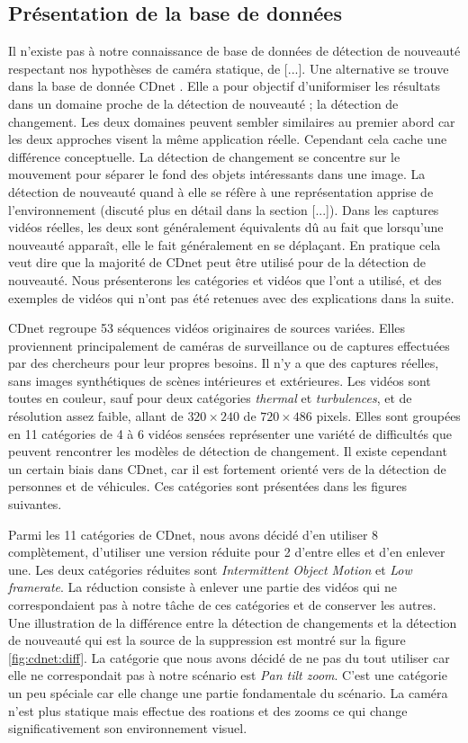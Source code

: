 	\subsection{Présentation de la base de données}

	Il n'existe pas à notre connaissance de base de données de détection de nouveauté respectant nos hypothèses de caméra statique, de [...]. Une alternative se trouve dans la base de donnée CDnet \cite{wang-cdnet}. Elle a pour objectif d'uniformiser les résultats dans un domaine proche de la détection de nouveauté ; la détection de changement. Les deux domaines peuvent sembler similaires au premier abord car les deux approches visent la même application réelle. Cependant cela cache une différence conceptuelle. La détection de changement se concentre sur le mouvement pour séparer le fond des objets intéressants dans une image. La détection de nouveauté quand à elle se réfère à une représentation apprise de l'environnement (discuté plus en détail dans la section [...]). Dans les captures vidéos réelles, les deux sont généralement équivalents dû au fait que lorsqu'une nouveauté apparaît, elle le fait généralement en se déplaçant. En pratique cela veut dire que la majorité de CDnet peut être utilisé pour de la détection de nouveauté. Nous présenterons les catégories et vidéos que l'ont a utilisé, et des exemples de vidéos qui n'ont pas été retenues avec des explications dans la suite.
	
	CDnet regroupe 53 séquences vidéos originaires de sources variées. Elles proviennent principalement de caméras de surveillance ou de captures effectuées par des chercheurs pour leur propres besoins. Il n'y a que des captures réelles, sans images synthétiques de scènes intérieures et extérieures. Les vidéos sont toutes en couleur, sauf pour deux catégories \textit{thermal} et \textit{turbulences}, et de résolution assez faible, allant de $320 \times 240$ de $720 \times 486$ pixels. Elles sont groupées en 11 catégories de 4 à 6 vidéos sensées représenter une variété de difficultés que peuvent rencontrer les modèles de détection de changement. Il existe cependant un certain biais dans CDnet, car il est fortement orienté vers de la détection de personnes et de véhicules. Ces catégories sont présentées dans les figures suivantes.

	Parmi les 11 catégories de CDnet, nous avons décidé d'en utiliser 8 complètement, d'utiliser une version réduite pour 2 d'entre elles et d'en enlever une. Les deux catégories réduites sont \textit{Intermittent Object Motion} et \textit{Low framerate}. La réduction consiste à enlever une partie des vidéos qui ne correspondaient pas à notre tâche de ces catégories et de conserver les autres. Une illustration de la différence entre la détection de changements et la détection de nouveauté qui est la source de la suppression est montré sur la figure \ref{fig:cdnet:diff}. La catégorie que nous avons décidé de ne pas du tout utiliser car elle ne correspondait pas à notre scénario est \textit{Pan tilt zoom}. C'est une catégorie un peu spéciale car elle change une partie fondamentale du scénario. La caméra n'est plus statique mais effectue des roations et des zooms ce qui change significativement son environnement visuel.


